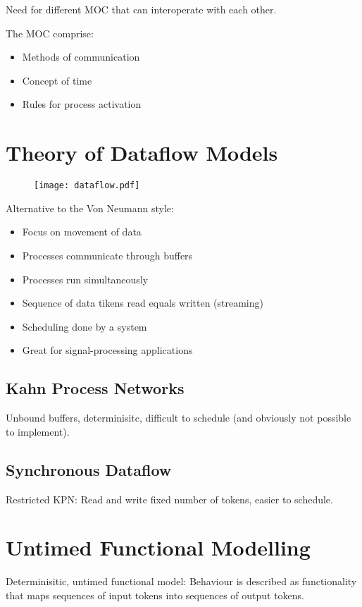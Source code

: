 Need for different MOC that can interoperate with each other.

The MOC comprise:
\begin{itemize}
    \item Methods of communication
    \item Concept of time
    \item Rules for process activation
\end{itemize}

\section{Theory of Dataflow Models}
\begin{figure}[H]
    \centering
    \texttt{[image: dataflow.pdf]}
\end{figure}
Alternative to the Von Neumann style:
\begin{itemize}
    \item Focus on movement of data
    \item Processes communicate through buffers
    \item Processes run simultaneously
    \item Sequence of data tikens read equals written (streaming)
    \item Scheduling done by a system
    \item Great for signal-processing applications
\end{itemize}

\subsection{Kahn Process Networks}
Unbound buffers, determinisitc, difficult to schedule (and obviously not possible to implement).

\subsection{Synchronous Dataflow}
Restricted KPN: Read and write fixed number of tokens, easier to schedule.

\section{Untimed Functional Modelling}
Determinisitic, untimed functional model: Behaviour is described as functionality that maps sequences of input tokens into sequences of output tokens.

